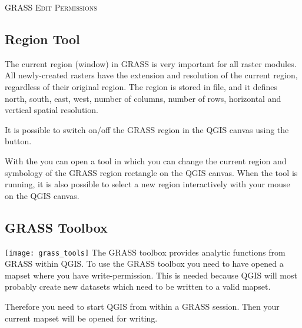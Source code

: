 \begin{Tip}\caption{\textsc{GRASS Edit Permissions}}
\end{Tip} 

\subsection{Region Tool}

The current region (window) in GRASS is very important for all 
raster modules. All newly-created rasters have the extension and resolution
of the current region, regardless of their original region. The region is
stored in  file, and it defines
north, south, east, west, number of columns, number of rows, 
horizontal and vertical spatial resolution.

It is possible to switch on/off the GRASS region in the QGIS canvas
using the  button. 

With the  you can open a tool 
in which you can change the current region and symbology
of the GRASS region rectangle on the QGIS canvas. When the tool is running,
it is also possible to select a new region interactively with your mouse
on the QGIS canvas.


\subsection{GRASS Toolbox}

\texttt{[image: grass\_tools]} The GRASS toolbox provides 
analytic functions from GRASS within QGIS. To
use the GRASS toolbox you need to have opened a mapset where you have
write-permission. This is needed because QGIS will most probably create
new datasets which need to be written to a valid mapset.

Therefore you need to start QGIS from within a GRASS session. Then your 
current mapset will be opened for writing.


